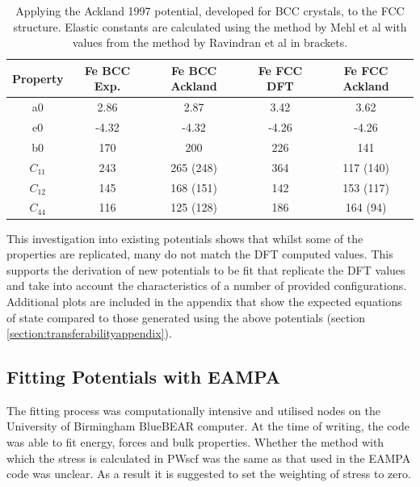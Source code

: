 \begin{table}[h]
\begin{center}
\begin{tabular}{c c c c c}
\hline\hline
Property   & Fe BCC Exp. & Fe BCC Ackland &  Fe FCC DFT & Fe FCC Ackland \\
\hline\hline
a0             &   2.86  &   2.87       &   3.42   &   3.62          \\
e0             &  -4.32  &  -4.32       &  -4.26   &  -4.26          \\
b0             &   170   &   200        &   226    &   141           \\
$C_{11}$       &   243   &   265 (248)  &   364    &   117 (140)     \\
$C_{12}$       &   145   &   168 (151)  &   142    &   153 (117)     \\
$C_{44}$       &   116   &   125 (128)  &   186    &   164 (94)      \\
\hline\hline
\end{tabular}
\end{center}
\caption{Applying the Ackland 1997 potential\cite{acklandfe}, developed for BCC crystals, to the FCC structure.  Elastic constants are calculated using the method by Mehl et al with values from the method by Ravindran et al in brackets.}
\label{table:feacklandtransferability}
\end{table}

This investigation into existing potentials shows that whilst some of the properties are replicated, many do not match the DFT computed values.  This supports the derivation of new potentials to be fit that replicate the DFT values and take into account the characteristics of a number of provided configurations.  Additional plots are included in the appendix that show the expected equations of state compared to those generated using the above potentials (section \ref{section:transferabilityappendix}).







\subsection{Fitting Potentials with EAMPA}

The fitting process was computationally intensive and utilised nodes on the University of Birmingham BlueBEAR computer.  At the time of writing, the code was able to fit energy, forces and bulk properties.  Whether the method with which the stress is calculated in PWscf was the same as that used in the EAMPA code was unclear.  As a result it is suggested to set the weighting of stress to zero.

